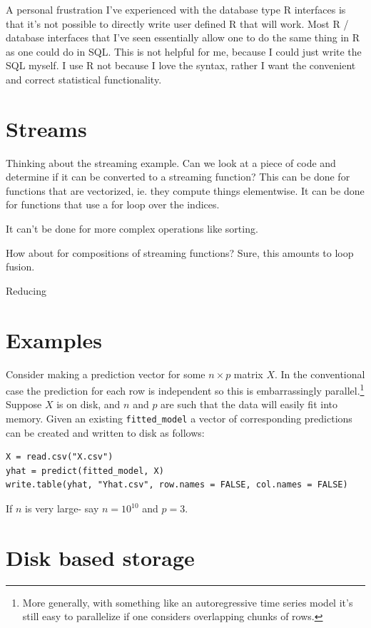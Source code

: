 \documentclass[12pt]{article}
\begin{document}
A personal frustration I've experienced with the database type R interfaces
is that it's not possible to directly write user defined R that will work.
Most R / database interfaces that I've seen essentially allow one to do the
same thing in R as one could do in SQL. This is not helpful for me, because
I could just write the SQL myself. I use R not because I love the syntax,
rather I want the convenient and correct statistical functionality.

\section{Streams}

Thinking about the streaming example. Can we look at a
piece of code and determine if it can be converted to a streaming function?
This can be done for functions that are vectorized, ie. they compute things
elementwise. It can be done for functions that use a for loop over the
indices. 

It can't be done for more complex operations like sorting.

How about for compositions of streaming functions? Sure, this amounts to
loop fusion.

Reducing

\section{Examples}

Consider making a prediction vector for some $n \times p$ matrix $X$. In
the conventional case the prediction for each row is independent so this is
embarrassingly parallel.\footnote{More generally, with something like an
autoregressive time series model it's still easy to parallelize if one
considers overlapping chunks of rows.} Suppose $X$ is on disk, and $n$ and
$p$ are such that the data will easily fit into memory.  Given an existing
\texttt{fitted_model} a vector of corresponding predictions can be created
and written to disk as follows:

\begin{verbatim}
X = read.csv("X.csv")
yhat = predict(fitted_model, X)
write.table(yhat, "Yhat.csv", row.names = FALSE, col.names = FALSE)
\end{verbatim}

If $n$ is very
large- say $n = 10^{10}$ and $p = 3$. 

\section{Disk based storage}
\end{document}
